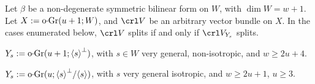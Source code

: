 \documentclass[11pt,reqno]{amsart}
\let\nit\noindent
\let\lan\langle
\let\ran\rangle
\numberwithin{equation}{section}
\numberwithin{figure}{section}
\let\ges\geqslant
\begin{document}
\begin{m-proposition}\label{prop:split-o}
Let $\beta$ be a non-degenerate symmetric bilinear form on $W$, with $\dim W=w+1$. 
Let $X:={{\rm o{{{\vrule height2.75pt depth-2.35pt width2.3pt \kern1.7pt}}\!}Gr}}(u+1;W)$, and $\crl V$ be an arbitrary vector bundle on $X$. 
In the cases enumerated below, $\crl V$ splits if and only if $\crl V_{Y_s}$ splits. 

\nit{\rm(i)} $Y_s:={{\rm o{{{\vrule height2.75pt depth-2.35pt width2.3pt \kern1.7pt}}\!}Gr}}(u+1;{{\lan {s}\ran}}^\perp)$, 
with $s\in W$ very general, non-isotropic, and $w\ges 2u+4$. 

\nit{\rm(ii)} $Y_s:={{\rm o{{{\vrule height2.75pt depth-2.35pt width2.3pt \kern1.7pt}}\!}Gr}}(u;{{\lan {s}\ran}}^\perp/{{\lan {s}\ran}})$, 
with $s$ very general isotropic, and $w\ges 2u+1$, $u\ges 3$. 
\end{m-proposition}
\end{document}

